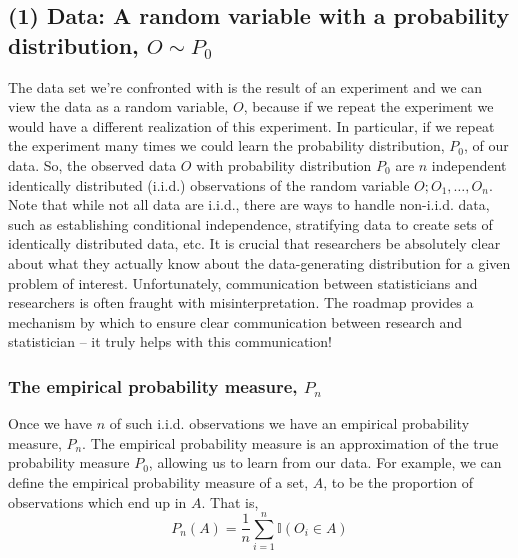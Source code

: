 \documentclass[
  12pt, krantz2,
]{book}
\theoremstyle{definition}
\theoremstyle{definition}
\theoremstyle{definition}
\newcommand{\1}{\mathbbm{1}}
\begin{document}
\hypertarget{data-a-random-variable-with-a-probability-distribution-o-sim-p_0}{%
\subsection*{\texorpdfstring{(1) Data: A random variable with a probability distribution, \(O \sim P_0\)}{(1) Data: A random variable with a probability distribution, O \textbackslash sim P\_0}}\label{data-a-random-variable-with-a-probability-distribution-o-sim-p_0}}


The data set we're confronted with is the result of an experiment and we can
view the data as a random variable, \(O\), because if we repeat the experiment
we would have a different realization of this experiment. In particular, if we
repeat the experiment many times we could learn the probability distribution,
\(P_0\), of our data. So, the observed data \(O\) with probability distribution
\(P_0\) are \(n\) independent identically distributed (i.i.d.) observations of the
random variable \(O; O_1, \ldots, O_n\). Note that while not all data are i.i.d.,
there are ways to handle non-i.i.d. data, such as establishing conditional
independence, stratifying data to create sets of identically distributed data,
etc. It is crucial that researchers be absolutely clear about what they actually
know about the data-generating distribution for a given problem of interest.
Unfortunately, communication between statisticians and researchers is often
fraught with misinterpretation. The roadmap provides a mechanism by which to
ensure clear communication between research and statistician -- it truly helps
with this communication!

\hypertarget{the-empirical-probability-measure-p_n}{%
\subsubsection*{\texorpdfstring{The empirical probability measure, \(P_n\)}{The empirical probability measure, P\_n}}\label{the-empirical-probability-measure-p_n}}


Once we have \(n\) of such i.i.d. observations we have an empirical probability
measure, \(P_n\). The empirical probability measure is an approximation of the
true probability measure \(P_0\), allowing us to learn from our data. For
example, we can define the empirical probability measure of a set, \(A\), to be
the proportion of observations which end up in \(A\). That is,
\begin{equation*}
  P_n(A) = \frac{1}{n}\sum_{i=1}^{n} \mathbb{I}(O_i \in A)
\end{equation*}
\end{document}
